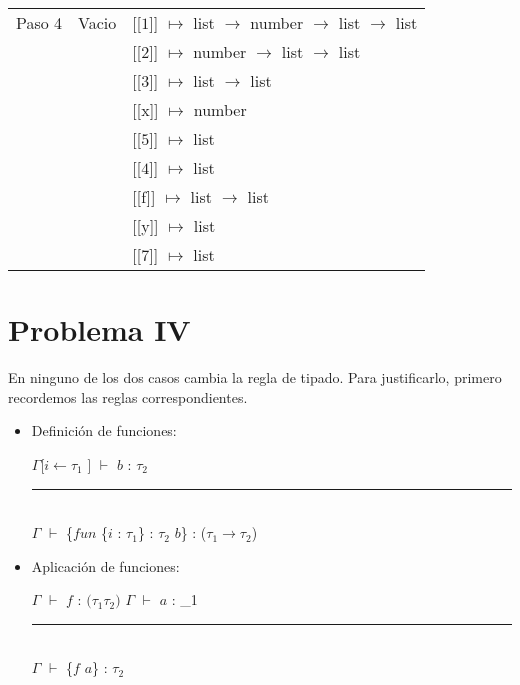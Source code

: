 \documentclass[12pt]{article}
\begin{document}
\begin{center}
\begin{longtable}{ | l | p{10 cm} | p{5 cm} | }
        Paso 4 &Vacio & [[$\boxed{1}$]] $\mapsto$ list $\rightarrow$ number $\rightarrow$ list $\rightarrow$ list \\
        & & [[$\boxed{2}$]] $\mapsto$ number $\rightarrow$ list $\rightarrow$ list \\
        & & [[$\boxed{3}$]] $\mapsto$ list $\rightarrow$ list \\
        & & [[x]] $\mapsto$ number \\
        & & [[$\boxed{5}$]] $\mapsto$ list \\
        & & [[$\boxed{4}$]] $\mapsto$ list \\
        & & [[f]] $\mapsto$ list $\rightarrow$ list \\
        & & [[y]] $\mapsto$ list \\
        & & [[$\boxed{7}$]] $\mapsto$ list \\
        \hline
    \end{longtable}
\end{center}


    \section*{Problema IV}
     En ninguno de los dos casos cambia la regla de tipado. Para justificarlo, primero recordemos las reglas correspondientes.
 \begin{itemize}
 \item Definición de funciones:
   \begin{center}
     \noindent\;\;\;\;\;\;\; $\Gamma$[$i\leftarrow\tau_1$ ] $\vdash$ $b$ : $\tau_2$\\
     \noindent\;\;\;\;\;\;\;\;\rule{7cm}{0.4pt}\\
     \noindent\;\;\;\;\;\;\;\;\;\;\;\;\;\;\;\;$\Gamma$ $\vdash$ \{$fun$ \{$i$ : $\tau_1$\} : $\tau_2$ $b$\} : ($\tau_1 \rightarrow \tau_2$)
   \end{center}
 \item Aplicación de funciones:
   \begin{center}
     $\Gamma$ $\vdash$ $f$ : $(\tau_1 $\rightarrow$ \tau_2)$ \;\;\; \;\;\;\;\;\; $\Gamma$ $\vdash$ $a$ : \tau_1\\
     \noindent\;\;\;\;\;\;\;\;\rule{7cm}{0.4pt}\\
     \noindent\;\;\;\;\;\;\;\;\;\;\;\;\;\;\;\;$\Gamma$ $\vdash$ \{$f$ $a$\} : $\tau_2$      
   \end{center}
 \end{itemize}
\end{document}
